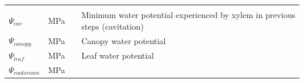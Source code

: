 \documentclass[]{book}
\begin{document}
\begin{longtable}[]{@{}llll@{}}
\begin{minipage}[t]{0.45\columnwidth}
\end{minipage}\tabularnewline
\begin{minipage}[t]{0.11\columnwidth}\raggedright
\(\Psi_{cav}\)\strut
\end{minipage} & \begin{minipage}[t]{0.10\columnwidth}\raggedright
MPa\strut
\end{minipage} & \begin{minipage}[t]{0.12\columnwidth}\raggedright
\strut
\end{minipage} & \begin{minipage}[t]{0.45\columnwidth}\raggedright
Minimum water potential experienced by xylem in previous steps (cavitation)\strut
\end{minipage}\tabularnewline
\begin{minipage}[t]{0.11\columnwidth}\raggedright
\(\Psi_{canopy}\)\strut
\end{minipage} & \begin{minipage}[t]{0.10\columnwidth}\raggedright
MPa\strut
\end{minipage} & \begin{minipage}[t]{0.12\columnwidth}\raggedright
\strut
\end{minipage} & \begin{minipage}[t]{0.45\columnwidth}\raggedright
Canopy water potential\strut
\end{minipage}\tabularnewline
\begin{minipage}[t]{0.11\columnwidth}\raggedright
\(\Psi_{leaf}\)\strut
\end{minipage} & \begin{minipage}[t]{0.10\columnwidth}\raggedright
MPa\strut
\end{minipage} & \begin{minipage}[t]{0.12\columnwidth}\raggedright
\strut
\end{minipage} & \begin{minipage}[t]{0.45\columnwidth}\raggedright
Leaf water potential\strut
\end{minipage}\tabularnewline
\begin{minipage}[t]{0.11\columnwidth}\raggedright
\(\Psi_{rootcrown}\)\strut
\end{minipage} & \begin{minipage}[t]{0.10\columnwidth}\raggedright
MPa\strut
\end{minipage} & \begin{minipage}[t]{0.12\columnwidth}\raggedright
\strut
\end{minipage} & \begin{minipage}[t]{0.45\columnwidth}\raggedright

\end{minipage}
\end{longtable}
\end{document}
